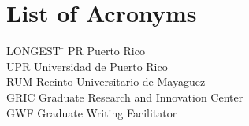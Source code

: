 

\chapter*{List of Acronyms}




 \noindent
\vspace{-1.75\baselineskip}
  \begin{tabbing}
LONGEST \=  \kill 
PR \> Puerto Rico\\
UPR \> Universidad de Puerto Rico\\ %
RUM \> Recinto Universitario de Mayaguez\\
GRIC \> Graduate Research and Innovation Center\\
GWF \> Graduate Writing Facilitator\\



\end{tabbing}